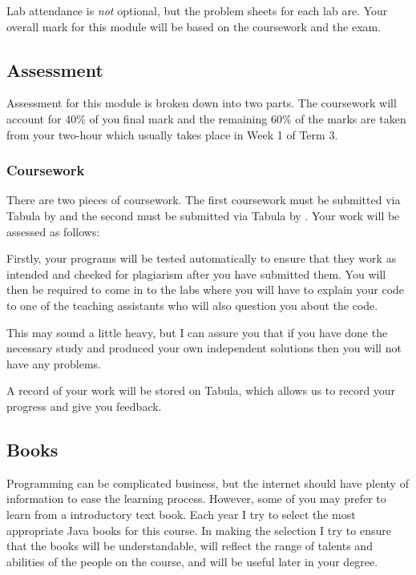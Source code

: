 Lab attendance is \emph{not} optional, but the problem sheets for each lab are. Your overall mark for this module will be based on the coursework and the exam.

\subsection{Assessment}

Assessment for this module is broken down into two parts. The coursework will account for 40\% of you final 
mark and the remaining 60\% of the marks are taken from your 
two-hour which usually takes place in Week 1 of Term 3.

\subsubsection{Coursework}

There are two pieces of coursework. The first coursework must be submitted via Tabula by \deadlineone and the second must be submitted via Tabula by \deadlinetwo. Your work will be assessed as follows:

Firstly, your programs will be tested automatically to ensure that they work as intended and checked for plagiarism after you have submitted them. You will then be required to come in to the labs where you will have to explain your code to one of the teaching assistants who will also question you about the code.

This may sound a little heavy, but I can assure you that if you have done the necessary study and produced your own independent solutions then you will not have any problems.

A record of your work will be stored on Tabula, which allows us to record your progress and give you feedback.

\subsection{Books}

Programming can be complicated business, but the internet
should have plenty of information to ease the learning process.
However, some of you may prefer to learn from a introductory text book.
Each year I try to select the most appropriate Java books for this course. 
In making the selection I try to ensure that the books will be understandable,
will reflect the range of talents and abilities of the people on the course,
and will be useful later in your degree. 

